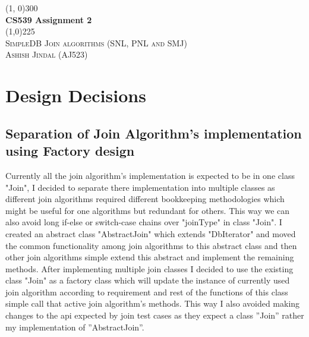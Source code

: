 \documentclass{article}
\begin{document}
\begin{titlepage}
\begin{center}

\line(1, 0){300}\\
[4mm]
\huge{\bfseries CS539 Assignment 2}\\
\line(1,0){225}\\
[4mm]
\textsc{\Large SimpleDB Join algorithms (SNL, PNL and SMJ)}\\
\textsc{\large Ashish Jindal (AJ523)}

\end{center}	

\section{Design Decisions}
\subsection{Separation of Join Algorithm's implementation using Factory design}
Currently all the join algorithm's implementation is expected to be in one class "Join", I decided to separate there implementation into multiple classes as different join algorithms required different bookkeeping methodologies which might be useful for one algorithms but redundant for others. This way we can also avoid long if-else or switch-case chains over "joinType" in class "Join". I created an abstract class "AbstractJoin" which extends "DbIterator" and moved the common functionality among join algorithms to this abstract class and then other join algorithms simple extend this abstract and implement the remaining methods. After implementing multiple join classes I decided to use the existing class "Join" as a factory class which will update the instance of currently used join algorithm according to requirement and rest of the functions of this class simple call
that active join algorithm's methods. This way I also avoided making changes to the api expected by join test cases as they expect a class ”Join” rather my implementation of ”AbstractJoin”.



\end{titlepage}
\end{document}
